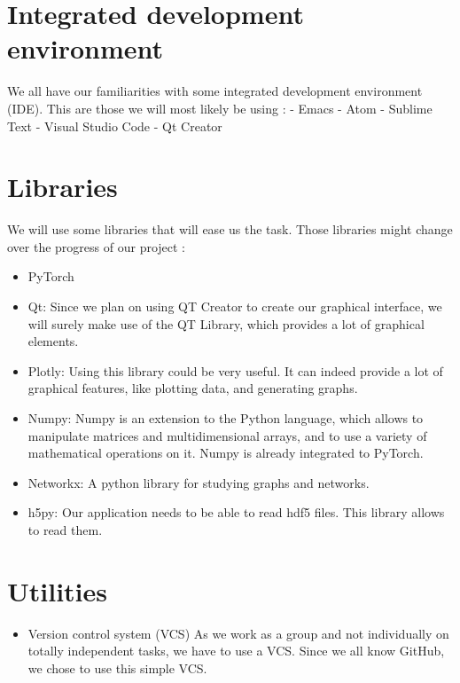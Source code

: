 \section{Integrated development environment}
We all have our familiarities with some integrated development environment (IDE).
This are those we will most likely be using : 
    - Emacs
    - Atom
    - Sublime Text
    - Visual Studio Code
    - Qt Creator

\section{Libraries}
We will use some libraries that will ease us the task. Those libraries might change over the progress of our project :
\begin{itemize}
    \item PyTorch 
    \item Qt: Since we plan on using QT Creator to create our graphical interface, we will surely make use of the QT Library, which provides a lot of graphical elements.
    \item Plotly: Using this library could be very useful. It can indeed provide a lot of graphical features, like plotting data, and generating graphs.
    \item Numpy: Numpy is an extension to the Python language, which allows to manipulate matrices and multidimensional arrays, and to use a variety of mathematical operations on it. Numpy is already integrated to PyTorch.
    \item Networkx: A python library for studying graphs and networks.
    \item h5py: Our application needs to be able to read hdf5 files. This library allows to read them.
\end{itemize}

\section{Utilities}

\begin{itemize}
    \item Version control system (VCS)
        As we work as a group and not individually on totally independent tasks, we have to use a VCS. Since we all know GitHub, we chose to use this simple VCS.
\end{itemize}
